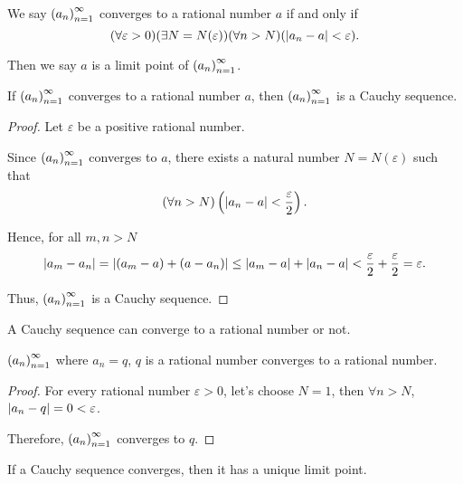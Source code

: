 \begin{definition}
    We say ${\left({a_{n}}\right)}^{\infty}_{n=1}$ converges to a rational number $a$ if and only if
    \[
        (\forall\varepsilon > 0)(\exists N=N(\varepsilon))(\forall n > N)(\left\vert{a_{n} - a}\right\vert < \varepsilon).
    \]

    Then we say $a$ is a limit point of ${\left({a_{n}}\right)}^{\infty}_{n=1}$.
\end{definition}

\begin{theorem}
    If ${\left({a_{n}}\right)}^{\infty}_{n=1}$ converges to a rational number $a$, then ${\left({a_{n}}\right)}^{\infty}_{n=1}$ is a Cauchy sequence.
\end{theorem}

\begin{proof}
    Let $\varepsilon$ be a positive rational number.

    Since ${\left({a_{n}}\right)}^{\infty}_{n=1}$ converges to $a$, there exists a natural number $N = N(\varepsilon)$ such that
    \[
        (\forall n > N)\left(\left\vert{a_{n} - a}\right\vert < \frac{\varepsilon}{2}\right).
    \]

    Hence, for all $m, n > N$
    \[
        \left\vert{a_{m} - a_{n}}\right\vert = \left\vert{(a_{m} - a) + (a - a_{n})}\right\vert \le \left\vert{a_{m} - a}\right\vert + \left\vert{a_{n} - a}\right\vert < \frac{\varepsilon}{2} + \frac{\varepsilon}{2} = \varepsilon.
    \]

    Thus, ${\left({a_{n}}\right)}^{\infty}_{n=1}$ is a Cauchy sequence.
\end{proof}

A Cauchy sequence can converge to a rational number or not.

\begin{example}
    ${\left({a_{n}}\right)}^{\infty}_{n=1}$ where $a_{n} = q$, $q$ is a rational number converges to a rational number.
\end{example}

\begin{proof}
    For every rational number $\varepsilon > 0$, let's choose $N = 1$, then $\forall n > N$, $\left\vert{a_{n} - q}\right\vert = 0 < \varepsilon$.

    Therefore, ${\left({a_{n}}\right)}^{\infty}_{n=1}$ converges to $q$.
\end{proof}

\begin{theorem}
    If a Cauchy sequence converges, then it has a unique limit point.
\end{theorem}

